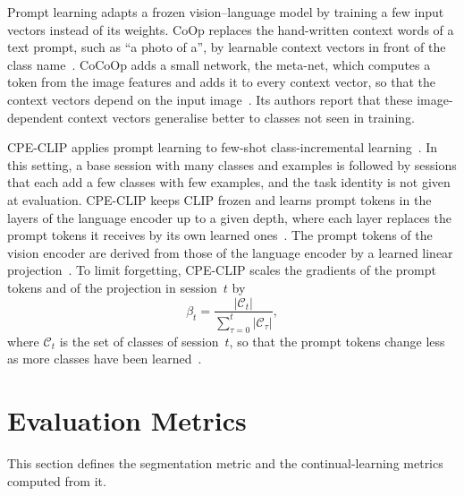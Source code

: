 Prompt learning adapts a frozen vision--language model by training a few input vectors instead of its weights.
CoOp replaces the hand-written context words of a text prompt, such as ``a photo of a'', by learnable context vectors in front of the class name~\cite{zhou2022coop}.
CoCoOp adds a small network, the meta-net, which computes a token from the image features and adds it to every context vector, so that the context vectors depend on the input image~\cite[Secs.~3.3 and~4.1]{zhou2022cocoop}.
Its authors report that these image-dependent context vectors generalise better to classes not seen in training.

CPE-CLIP applies prompt learning to few-shot class-incremental learning~\cite[Sec.~1, 3]{D_Alessandro_2023}.
In this setting, a base session with many classes and examples is followed by sessions that each add a few classes with few examples, and the task identity is not given at evaluation.
CPE-CLIP keeps CLIP frozen and learns prompt tokens in the layers of the language encoder up to a given depth, where each layer replaces the prompt tokens it receives by its own learned ones~\cite[Sec.~4, Eqs.~2--4]{D_Alessandro_2023}.
The prompt tokens of the vision encoder are derived from those of the language encoder by a learned linear projection~\cite[Sec.~4, Eqs.~6--8]{D_Alessandro_2023}.
To limit forgetting, CPE-CLIP scales the gradients of the prompt tokens and of the projection in session~$t$ by
\begin{equation}
\beta_t = \frac{|\mathcal{C}_t|}{\sum_{\tau=0}^{t} |\mathcal{C}_\tau|},
\label{eq:bg-cpe-scaling}
\end{equation}
where $\mathcal{C}_t$ is the set of classes of session~$t$, so that the prompt tokens change less as more classes have been learned~\cite[Sec.~4, Eqs.~11--13]{D_Alessandro_2023}.

\section{Evaluation Metrics}
\label{sec:bg-metrics}

This section defines the segmentation metric and the continual-learning metrics computed from it.

